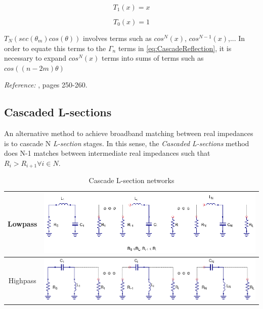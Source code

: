 \begin{equation}
T_1(x) = x
\end{equation}

\begin{equation}
T_0(x) = 1
\end{equation}

\noindent $T_N(sec(\theta_m)cos(\theta))$ involves terms such as $cos^N(x)$, $cos^{N-1}(x)$,... In order to equate this terms to the $\Gamma_n$ terms in \ref{eq:CascadeReflection}, it is necessary to expand $cos^N(x)$ terms into sums of terms such as $cos((n-2m)\theta)$

\noindent \textit{Reference:} \cite{Pozar}, pages 250-260.

\subsection{Cascaded L-sections}
An alternative method to achieve broadband matching between real impedances is to cascade N \textit{L-section} stages. In this sense, the \textit{Cascaded L-sections} method does N-1 matches between intermediate real impedances such that $R_i > R_{i+1} \forall i \in N$.

\begin{table}[H]
  \centering
  \begin{tabular}{ | c | c | }
    \hline
    Lowpass & \begin{minipage}{.4\textwidth}
      \includegraphics[width=\linewidth]{./images/Synthesis/Impedance_Matching/CascadedLCsch-lowpass}
    \end{minipage}\\ \hline
    Highpass
    &
    \begin{minipage}{.4\textwidth}
      \includegraphics[width=\linewidth]{./images/Synthesis/Impedance_Matching/CascadedLCsch-highpass}
    \end{minipage}
\\ \hline
  \end{tabular}
  \caption{Cascade L-section networks}
  \label{tbl:cascaded-l-section-lowpass-highpass-schematic}
\end{table}


